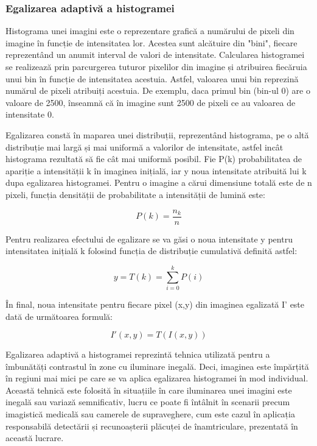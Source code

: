 \documentclass[12pt]{article}
\begin{document}
\subsubsection{Egalizarea adaptiv\u{a} a histogramei}

Histograma unei imagini este o reprezentare grafic\u{a} a num\u{a}rului de pixeli din imagine \^{i}n funcție de intensitatea lor. Acestea sunt alc\u{a}tuire din "bini", fiecare reprezent\^{a}nd un anumit interval de valori de intensitate. Calcularea histogramei se realizeaz\u{a} prin parcurgerea tuturor pixelilor din imagine și atribuirea fiec\u{a}ruia unui bin \^{i}n funcție de intensitatea acestuia. Astfel, valoarea unui bin reprezin\u{a} num\u{a}rul de pixeli atribuiți acestuia. De exemplu, daca primul bin (bin-ul 0) are o valoare de 2500, \^{i}nseamn\u{a} c\u{a} \^{i}n imagine sunt 2500 de pixeli ce au valoarea de intensitate 0.

Egalizarea const\u{a} \^{i}n maparea unei distribuții, reprezent\^{a}nd histograma, pe o alt\u{a} distribuție mai larg\u{a} și mai uniform\u{a} a valorilor de intensitate, astfel inc\^{a}t histograma rezultat\u{a} s\u{a} fie c\^{a}t mai uniform\u{a} posibil. Fie P(k) probabilitatea de apariție a intensit\u{a}ții k \^{i}n imaginea inițial\u{a}, iar y noua intensitate atribuit\u{a} lui k dupa egalizarea histogramei. Pentru o imagine a c\u{a}rui dimensiune total\u{a} este de n pixeli, funcția densit\u{a}ții de probabilitate a intensit\u{a}ții de lumin\u{a} este:

\begin{equation}
    P(k) = \frac{n_k}{n}
\end{equation}

Pentru realizarea efectului de egalizare se va g\u{a}si o noua intensitate y pentru intensitatea inițial\u{a} k folosind funcția de distribuție cumulativ\u{a} definit\u{a} astfel:

\begin{equation}
y = T(k) = \sum_{i=0}^{k} P(i)
\end{equation}

\^{I}n final, noua intensitate pentru fiecare pixel (x,y) din imaginea egalizat\u{a} I' este dat\u{a} de urm\u{a}toarea formul\u{a}:

\begin{equation}
I'(x,y) = T(I(x,y))
\end{equation}

Egalizarea adaptiv\u{a} a histogramei reprezint\u{a} tehnica utilizat\u{a} pentru a \^{i}mbun\u{a}t\u{a}ți contrastul \^{i}n zone cu iluminare inegal\u{a}. Deci, imaginea este \^{i}mp\u{a}rțit\u{a} \^{i}n regiuni mai mici pe care se va aplica egalizarea histogramei \^{i}n mod individual. Aceast\u{a} tehnic\u{a} este folosit\u{a} \^{i}n situațiile \^{i}n care iluminarea unei imagini este inegal\u{a} sau variaz\u{a} semnificativ, lucru ce poate fi \^{i}nt\^{a}lnit \^{i}n scenarii precum imagistic\u{a} medical\u{a} sau camerele de supraveghere, cum este cazul \^{i}n aplicația responsabil\u{a} detect\u{a}rii și recunoașterii pl\u{a}cuței de \^{i}namtriculare, prezentat\u{a} \^{i}n aceast\u{a} lucrare. 
\end{document}
